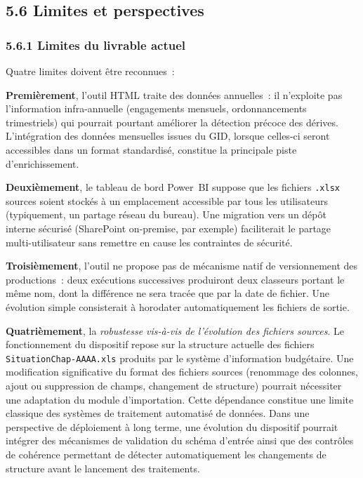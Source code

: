 \subsection*{5.6 \quad Limites et perspectives}

\subsubsection*{5.6.1 \quad Limites du livrable actuel}

Quatre limites doivent \^etre reconnues~:

\textbf{Premi\`erement}, l'outil HTML traite des donn\'ees annuelles~: il
n'exploite pas l'information infra-annuelle (engagements mensuels,
ordonnancements trimestriels) qui pourrait pourtant am\'eliorer la
d\'etection pr\'ecoce des d\'erives. L'int\'egration des donn\'ees
mensuelles issues du GID, lorsque celles-ci seront accessibles dans un
format standardis\'e, constitue la principale piste d'enrichissement.

\textbf{Deuxi\`emement}, le tableau de bord Power~BI suppose que les
fichiers \texttt{.xlsx} sources soient stock\'es \`a un emplacement
accessible par tous les utilisateurs (typiquement, un partage r\'eseau du
bureau). Une migration vers un d\'ep\^ot interne s\'ecuris\'e (SharePoint
on-premise, par exemple) faciliterait le partage multi-utilisateur sans
remettre en cause les contraintes de s\'ecurit\'e.

\textbf{Troisi\`emement}, l'outil ne propose pas de m\'ecanisme natif de
versionnement des productions~: deux ex\'ecutions successives produiront
deux classeurs portant le m\^eme nom, dont la diff\'erence ne sera
trac\'ee que par la date de fichier. Une \'evolution simple consisterait
\`a horodater automatiquement les fichiers de sortie.

\textbf{Quatri\`emement}, la \textit{robustesse vis-\`a-vis de
l'\'evolution des fichiers sources}. Le fonctionnement du dispositif
repose sur la structure actuelle des fichiers \texttt{SituationChap-AAAA.xls}
produits par le syst\`eme d'information budg\'etaire. Une modification
significative du format des fichiers sources (renommage des colonnes,
ajout ou suppression de champs, changement de structure) pourrait
n\'ecessiter une adaptation du module d'importation. Cette d\'ependance
constitue une limite classique des syst\`emes de traitement automatis\'e
de donn\'ees. Dans une perspective de d\'eploiement \`a long terme, une
\'evolution du dispositif pourrait int\'egrer des m\'ecanismes de
validation du sch\'ema d'entr\'ee ainsi que des contr\^oles de coh\'erence
permettant de d\'etecter automatiquement les changements de structure
avant le lancement des traitements.

